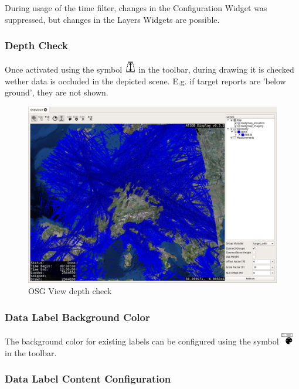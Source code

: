 {During usage of the time filter, changes in the Configuration Widget was suppressed, but changes in the Layers Widgets are possible.

\subsubsection{Depth Check}

Once activated using the symbol \includegraphics[width=0.5cm]{../../data/icons/depth.png} in the toolbar, during drawing it is checked wether data is occluded in the depicted scene. E.g. if target reports are 'below ground', they are not shown.

\begin{figure}[H]
    \hspace*{-2cm}
    \includegraphics[width=18cm,frame]{../screenshots/osgview_depth_check.png}
  \caption{OSG View depth check}
\end{figure}

\subsubsection{Data Label Background Color}

The background color for existing labels can be configured using the symbol \includegraphics[width=0.5cm]{../../data/icons/label_color.png} in the toolbar.

\subsubsection{Data Label Content Configuration}

}
